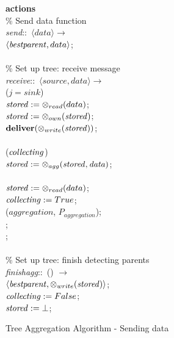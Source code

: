 \begin{figure}[H]
  \centering
  \begin{boxedminipage}{\linewidth}
    \null \textbf{actions}\\
    \null\qq \% Send data function\\
    \null\qq \emph{send}::~$\langle data\rangle \rightarrow$\\
    \null\qq\qq {}$\langle \mbox{\emph{bestparent}}, data\rangle$;\\~\\
    \null\qq \% Set up tree: receive message\\
    \null\qq \emph{receive}::~$\langle source, data\rangle \rightarrow$\\
    \null\qq\qq {} ($j = sink$)  \\
    \null\qq\qq\qq $\mbox{\emph{stored}} \mathrel{:=} \otimes_{read}(data)$; \\
    \null\qq\qq\qq $\mbox{\emph{stored}} \mathrel{:=} \otimes_{own}(\mbox{\emph{stored}})$; \\
    \null\qq\qq\qq $\mbox{\textbf{deliver}}(\otimes_{write}(\mbox{\emph{stored}}))$; \\
    \null\qq\qq {} \\
    \null\qq\qq\qq {} ($\mbox{\emph{collecting}}$)  \\
    \null\qq\qq\qq\qq $\mbox{\emph{stored}} \mathrel{:=} \otimes_{agg}(\mbox{\emph{stored}}, \mbox{\emph{data}})$; \\
    \null\qq\qq\qq {} \\
    \null\qq\qq\qq\qq $\mbox{\emph{stored}} \mathrel{:=} \otimes_{read}(data)$; \\
    \null\qq\qq\qq\qq $\mbox{\emph{collecting}} \mathrel{:=} True$; \\
    \null\qq\qq\qq\qq {}($\mathit{aggregation}$, $P_{aggregation}$); \\
    \null\qq\qq\qq {}; \\
    \null\qq\qq {}; \\~\\
    \null\qq \% Set up tree: finish detecting parents\\
    \null\qq \emph{finishagg}::~() $\rightarrow$\\
    \null\qq\qq {}$\langle \mbox{\emph{bestparent}}, \otimes_{write}(\mbox{\emph{stored}})\rangle$;\\
    \null\qq\qq $\mbox{\emph{collecting}} \mathrel{:=} False$; \\
    \null\qq\qq $\mbox{\emph{stored}} \mathrel{:=} \bot$; \\
  \end{boxedminipage}
  \caption{Tree Aggregation Algorithm - Sending data}
\end{figure}


